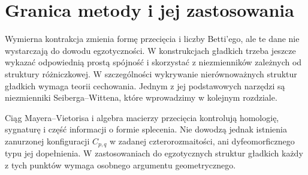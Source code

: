 \section{Granica metody i jej zastosowania}
\label{sec:tg-general-limit}

Wymierna kontrakcja zmienia formę przecięcia i liczby Betti'ego,
ale te dane nie wystarczają do dowodu egzotyczności.
W konstrukcjach gładkich trzeba jeszcze wykazać odpowiednią
prostą spójność i skorzystać z niezmienników zależnych od
struktury różniczkowej. W szczególności wykrywanie
nierównoważnych struktur gładkich wymaga teorii cechowania.
Jednym z jej podstawowych narzędzi są niezmienniki
Seiberga--Wittena, które wprowadzimy w kolejnym rozdziale.

\begin{uwaga}
Ciąg Mayera--Vietorisa i algebra macierzy przecięcia
kontrolują homologię, sygnaturę i część informacji
o formie splecenia. Nie dowodzą jednak istnienia
zanurzonej konfiguracji $C_{p,q}$ w zadanej
czterorozmaitości, ani dyfeomorficznego typu jej
dopełnienia. W zastosowaniach do egzotycznych struktur
gładkich każdy z tych punktów wymaga osobnego
argumentu geometrycznego.
\end{uwaga}

